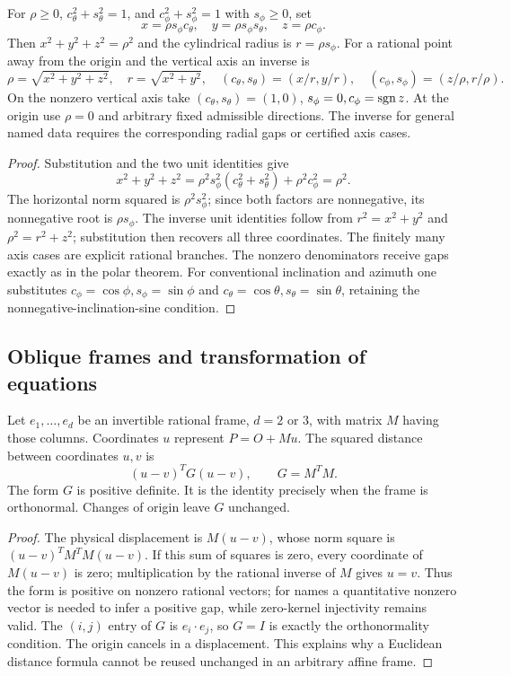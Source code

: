 \begin{theorem}
\label{coord:spherical}
For $\rho\ge0$, $c_\theta^2+s_\theta^2=1$, and
$c_\phi^2+s_\phi^2=1$ with $s_\phi\ge0$, set
\[
 x=\rho s_\phi c_\theta,\quad
 y=\rho s_\phi s_\theta,\quad z=\rho c_\phi.
\]
Then $x^2+y^2+z^2=\rho^2$ and the cylindrical radius is
$r=\rho s_\phi$. For a rational point away from the origin and the
vertical axis an inverse is
\[
 \rho=\sqrt{x^2+y^2+z^2},\quad r=\sqrt{x^2+y^2},\quad
 (c_\theta,s_\theta)=(x/r,y/r),\quad
 (c_\phi,s_\phi)=(z/\rho,r/\rho).
\]
On the nonzero vertical axis take $(c_\theta,s_\theta)=(1,0)$,
$s_\phi=0,c_\phi=\operatorname{sgn} z$. At the origin use $\rho=0$ and arbitrary
fixed admissible directions. The inverse for general named data
requires the corresponding radial gaps or certified axis cases.
\end{theorem}
\begin{proof}
Substitution and the two unit identities give
\[
 x^2+y^2+z^2
 =\rho^2s_\phi^2(c_\theta^2+s_\theta^2)+\rho^2c_\phi^2
 =\rho^2.
\]
The horizontal norm squared is $\rho^2s_\phi^2$; since both factors
are nonnegative, its nonnegative root is $\rho s_\phi$. The inverse
unit identities follow from $r^2=x^2+y^2$ and $\rho^2=r^2+z^2$;
substitution then recovers all three coordinates. The finitely many
axis cases are explicit rational branches. The nonzero denominators
receive gaps exactly as in the polar theorem. For conventional
inclination and azimuth one substitutes
$c_\phi=\cos\phi,s_\phi=\sin\phi$ and
$c_\theta=\cos\theta,s_\theta=\sin\theta$, retaining the
nonnegative-inclination-sine condition.
\end{proof}

\subsection{Oblique frames and transformation of equations}

\begin{theorem}
\label{coord:gram-metric}
Let $e_1,\ldots,e_d$ be an invertible rational frame, $d=2$ or $3$, with
matrix $M$ having those columns. Coordinates $u$ represent $P=O+Mu$.
The squared distance between coordinates $u,v$ is
\[
 (u-v)^TG(u-v),\qquad G=M^TM.
\]
The form $G$ is positive definite. It is the identity precisely when
the frame is orthonormal. Changes of origin leave $G$ unchanged.
\end{theorem}
\begin{proof}
The physical displacement is $M(u-v)$, whose norm square is
$(u-v)^TM^TM(u-v)$. If this sum of squares is zero, every coordinate
of $M(u-v)$ is zero; multiplication by the rational inverse of $M$
gives $u=v$. Thus the form is positive on nonzero rational vectors;
for names a quantitative nonzero vector is needed to infer a positive
gap, while zero-kernel injectivity remains valid. The $(i,j)$ entry of
$G$ is $e_i\cdot e_j$, so $G=I$ is exactly the orthonormality
condition. The origin cancels in a displacement. This explains why a
Euclidean distance formula cannot be reused unchanged in an arbitrary
affine frame.
\end{proof}

